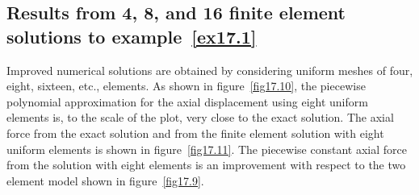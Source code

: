 \documentclass{AeroStructure-ERJohnson}
\begin{document}
\subsection{Results from 4, 8, and 16 finite element solutions to example~\ref{ex17.1}}\label{sec17.2.1}

Improved numerical solutions are obtained by considering uniform meshes of four, eight, sixteen, etc., elements. As shown in figure~\ref{fig17.10}, the piecewise polynomial approximation for the axial displacement using eight uniform elements is, to the scale of the plot, very close to the exact solution. The axial force from the exact solution and from the finite element solution with eight uniform elements is shown in figure~\ref{fig17.11}. The piecewise constant axial force from the solution with eight elements is an improvement with respect to the two element model shown in figure~\ref{fig17.9}.

{\def\thefigure{17.10}
}


{\def\thefigure{17.11}
}
\end{document}
